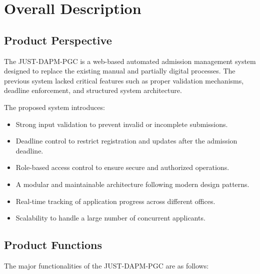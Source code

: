 \section{Overall Description}

\subsection{Product Perspective}
The JUST-DAPM-PGC is a web-based automated admission management system designed to replace the existing manual and partially digital processes. The previous system lacked critical features such as proper validation mechanisms, deadline enforcement, and structured system architecture.

\medskip
\noindent The proposed system introduces:
\begin{itemize}[leftmargin=1.5cm, labelsep=0.5cm]
    \item Strong input validation to prevent invalid or incomplete submissions.
    \item Deadline control to restrict registration and updates after the admission deadline.
    \item Role-based access control to ensure secure and authorized operations.
    \item A modular and maintainable architecture following modern design patterns.
    \item Real-time tracking of application progress across different offices.
    \item Scalability to handle a large number of concurrent applicants.
\end{itemize}

\subsection{Product Functions}
The major functionalities of the JUST-DAPM-PGC are as follows:

